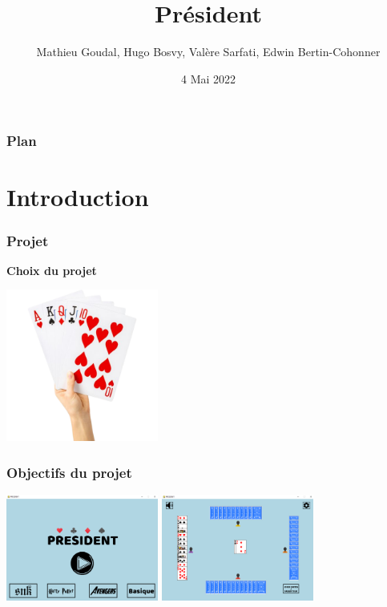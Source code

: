 \documentclass{beamer}
\title{Président}
\date{4 Mai 2022}
\author{Mathieu Goudal, Hugo Bosvy, Valère Sarfati, Edwin Bertin-Cohonner}
\institute{Université de Caen Normandie}
\begin{document}
\maketitle

\begin{frame} 
\frametitle{Plan}
\tableofcontents
\end{frame}
\section{Introduction}
\begin{frame}
\frametitle{Projet}
\textbf{Choix du projet}
\begin{center}
\includegraphics[width=5cm]{./img/cartes.png}
\end{center}
\end{frame}

\begin{frame}
\frametitle{Objectifs du projet}

\begin{center}
\includegraphics[width=5cm]{./img/accueil.png}
\includegraphics[width=5cm]{./img/cartes_posees.png}
\end{center}

\end{frame}
\end{document}

